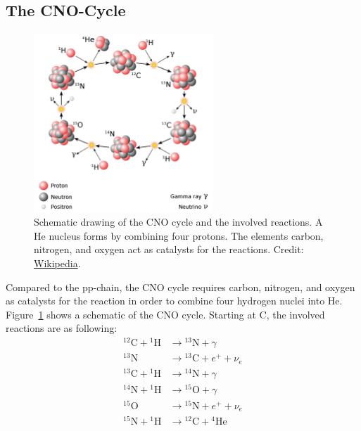 \subsection{The CNO-Cycle}
\begin{figure}[tb]
    \centering
    \includegraphics[width=0.6\textwidth]{graphics/sun/cno_cycle}
    \caption{Schematic drawing of the CNO cycle and the involved reactions. A He nucleus forms by combining four protons. The elements carbon, nitrogen, and oxygen act as catalysts for the reactions. Credit: \href{https://en.wikipedia.org/wiki/CNO_cycle}{Wikipedia}.}
    \label{fig:sun:cno_cycle}
\end{figure}
Compared to the \ac{pp-chain}, the CNO cycle requires carbon, nitrogen, and oxygen as catalysts for the reaction in order to combine four hydrogen nuclei into He. Figure~\ref{fig:sun:cno_cycle} shows a schematic of the CNO cycle. Starting at C, the involved reactions are as following:
\begin{align}
    {^{12}}\mathrm{C} + {^1}\mathrm{H} &\longrightarrow {^{13}}\mathrm{N} + \gamma\\
    {^{13}}\mathrm{N} &\longrightarrow {^{13}}\mathrm{C} + e^+ + \nu_e \\
    {^{13}}\mathrm{C} + {^1}\mathrm{H} &\longrightarrow {^{14}}\mathrm{N} + \gamma\\
    {^{14}}\mathrm{N} + {^1}\mathrm{H} &\longrightarrow {^{15}}\mathrm{O} + \gamma \label{eqn:sun:cno_cycle_n14_consumption}\\
    {^{15}}\mathrm{O} &\longrightarrow {^{15}}\mathrm{N} + e^+ + \nu_e\\
    {^{15}}\mathrm{N} + {^1}\mathrm{H} &\longrightarrow {^{12}}\mathrm{C} + {^4}\mathrm{He} \label{eqn:sun:cno_cycle_last_reaction}
\end{align}

